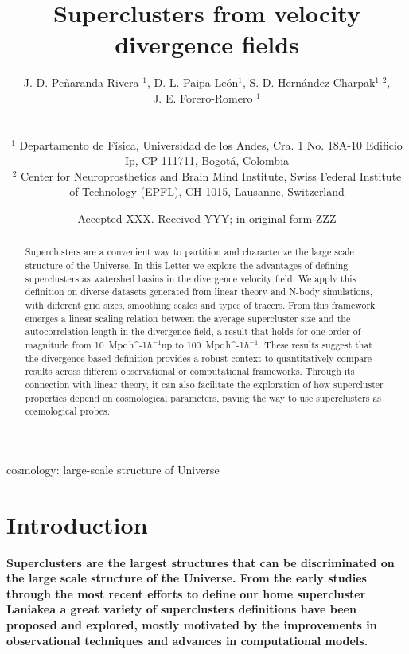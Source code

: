 \documentclass[usenatbib]{mnras}
\title[Superclusters from velocity divergence fields]{Superclusters from velocity divergence fields}
\author[Pe\~naranda-Rivera et al.]{
\parbox[t]{\textwidth}{
    {J. D. Pe\~naranda-Rivera $^1$,} 
    {D. L. Paipa-Le\'on$^{1}$,}
    {S. D. Hern\'andez-Charpak$^{1,2}$,}\\
    {J. E. Forero-Romero $^{1}$}
}
\\\\
$^{1}$ Departamento de F\'isica, Universidad de los Andes, Cra. 1
  No. 18A-10 Edificio Ip, CP 111711, Bogot\'a, Colombia \\
$^{2}$ Center for Neuroprosthetics and Brain Mind Institute, Swiss
  Federal Institute of Technology (EPFL), CH-1015, Lausanne,
  Switzerland\\  
}
\date{Accepted XXX. Received YYY; in original form ZZZ}
\newcommand{\Mpch}{\,{\rm Mpc}\,\ifmmode h^{-1}\else $h^{-1}$\fi}
\begin{document}
\label{firstpage}
\pagerange{\pageref{firstpage}--\pageref{lastpage}}
\maketitle

\maketitle
\begin{abstract}
Superclusters are a convenient way to partition and characterize the large scale structure of the Universe.
In this Letter we explore the advantages of defining superclusters as watershed basins in the divergence velocity field.
We apply this definition on diverse datasets generated from linear theory and  N-body simulations, with different grid sizes, smoothing scales and types of tracers.
From this framework emerges a linear scaling relation between the average supercluster size and the autocorrelation length in the divergence field, a result that holds for one order of magnitude from 10 \Mpch up to 100 \Mpch.
These results suggest that the divergence-based definition provides a robust context to quantitatively compare results across different observational or computational frameworks. 
Through its connection with linear theory, it can also facilitate the exploration of how supercluster properties depend on cosmological parameters, 
paving the way to use superclusters as cosmological probes.
\end{abstract}

\begin{keywords}
cosmology: large-scale structure of Universe
\end{keywords}




\section{Introduction}

\textbf{
Superclusters are the largest structures that can be discriminated on the large scale structure of the Universe. 
From the early studies \citep{1983ARA&A..21..373O} through the most recent efforts to define our home supercluster Laniakea \citep{2014Natur.513...71T} a great variety of superclusters definitions have been proposed and explored, mostly motivated by the improvements in observational techniques and advances in computational models. 
}
\end{document}
